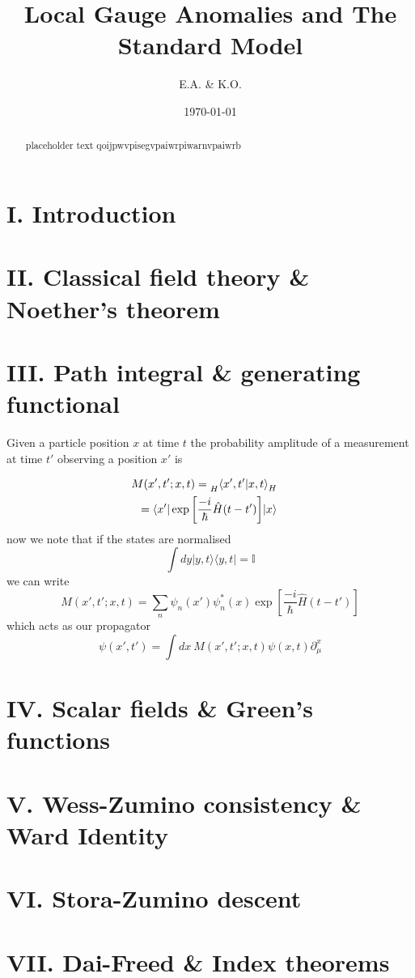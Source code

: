 \documentclass[11pt,aps,prl,lengthcheck]{revtex4-2}
\begin{document}
\title{Local Gauge Anomalies and The Standard Model}
\author{E.A. \& K.O.}
\date{\today}
\begin{abstract}
\noindent
placeholder text qoijpwvpisegvpaiwrpiwarnvpaiwrb
\end{abstract}
\maketitle

\section{I\@. Introduction}
\section{II\@. Classical field theory \& Noether's theorem}
\section{III\@. Path integral \& generating functional}
Given a particle position $x$ at time $t$ the probability amplitude of
a measurement at time $t'$ observing a position $x'$ is

\begin{align*}
  \begin{split}
  M(x', t'; x, t) &= \prescript{}{H}{\braket{x',t'|x, t}_{H}}
  \end{split} \\
  \begin{split}
  &= \braket{x'|\exp{\left[\frac{-i}{\hbar}\hat{H}(t-t')\right]}|x}
  \end{split}
\end{align*}\label{eq:1}
now we note that if the states are normalised
\begin{equation}
  \int{dy |y,t\rangle{} \langle{y,t|} } = \mathbb{I}
\end{equation}
we can write 
  \begin{equation}
    M(x', t'; x, t) = \sum_{n}{\psi_{n}(x')\psi_{n}^*(x)\exp{\left[\frac{-i}{\hbar}\hat{H}(t-t')\right]}}
  \end{equation}
which acts as our propagator
\begin{equation}
 \psi(x', t') = \int{dx \ M(x', t'; x, t) \psi(x, t)}
 \partial^{x}_{\mu}
\end{equation}



\section{IV\@. Scalar fields \& Green's functions}
\section{V\@. Wess-Zumino consistency \& Ward Identity}
\section{VI\@. Stora-Zumino descent}
\section{VII\@. Dai-Freed \& Index theorems}
\end{document}
